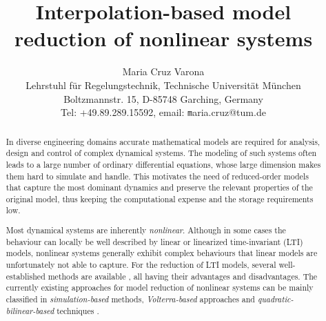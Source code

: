 \documentclass[11pt]{article}
\begin{document}
	
\title{Interpolation-based model reduction of nonlinear systems}

\author{Maria Cruz Varona\\[0.1cm]{\footnotesize Lehrstuhl f\"ur Regelungstechnik, Technische Universit\"at M\"unchen}\\ {\footnotesize Boltzmannstr. 15, D-85748 Garching, Germany}\\{\footnotesize Tel: +49.89.289.15592, email: {\texttt maria.cruz@tum.de}}}

\maketitle

\begin{abstract}
In diverse engineering domains accurate mathematical models are required for analysis, design and control of complex dynamical systems. The modeling of such systems often leads to a large number of ordinary differential equations, whose large dimension makes them hard to simulate and handle. This motivates the need of reduced-order models that capture the most dominant dynamics and preserve the relevant properties of the original model, thus keeping the computational expense and the storage requirements low.  

Most dynamical systems are inherently \emph{nonlinear}. Although in some cases the behaviour can locally be well described by linear or linearized time-invariant (LTI) models, nonlinear systems generally exhibit complex behaviours that linear models are unfortunately not able to capture. For the reduction of LTI models, several well-established methods are available \cite{Antoulas_Book}, all having their advantages and disadvantages. The currently existing approaches for model reduction of nonlinear systems can be mainly classified in \emph{simulation-based} methods, \emph{Volterra-based} approaches and \emph{quadratic-bilinear-based} techniques \cite{Baur_2014_Survey}. 



\end{abstract}
\end{document}
